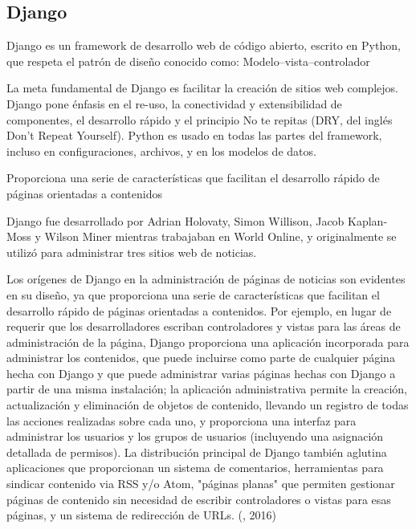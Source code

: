 \subsection{Django}
\setlength{\parskip}{5mm}
Django es un framework de desarrollo web de código abierto, escrito en Python, que respeta el patrón de diseño conocido como: Modelo–vista–controlador

La meta fundamental de Django es facilitar la creación de sitios web complejos. Django pone énfasis en el re-uso, la conectividad y extensibilidad de componentes, el desarrollo rápido y el principio No te repitas (DRY, del inglés Don't Repeat Yourself). Python es usado en todas las partes del framework, incluso en configuraciones, archivos, y en los modelos de datos.

Proporciona una serie de características que facilitan el desarrollo rápido de páginas orientadas a contenidos

Django fue desarrollado por Adrian Holovaty, Simon Willison, Jacob Kaplan-Moss y Wilson Miner mientras trabajaban en World Online, y originalmente se utilizó para administrar tres sitios web de noticias.

Los orígenes de Django en la administración de páginas de noticias son evidentes en su diseño, ya que proporciona una serie de características que facilitan el desarrollo rápido de páginas orientadas a contenidos. Por ejemplo, en lugar de requerir que los desarrolladores escriban controladores y vistas para las áreas de administración de la página, Django proporciona una aplicación incorporada para administrar los contenidos, que puede incluirse como parte de cualquier página hecha con Django y que puede administrar varias páginas hechas con Django a partir de una misma instalación; la aplicación administrativa permite la creación, actualización y eliminación de objetos de contenido, llevando un registro de todas las acciones realizadas sobre cada uno, y proporciona una interfaz para administrar los usuarios y los grupos de usuarios (incluyendo una asignación detallada de permisos).
La distribución principal de Django también aglutina aplicaciones que proporcionan un sistema de comentarios, herramientas para sindicar contenido via RSS y/o Atom, "páginas planas" que permiten gestionar páginas de contenido sin necesidad de escribir controladores o vistas para esas páginas, y un sistema de redirección de URLs. (\citet{djangobib}, 2016) 

